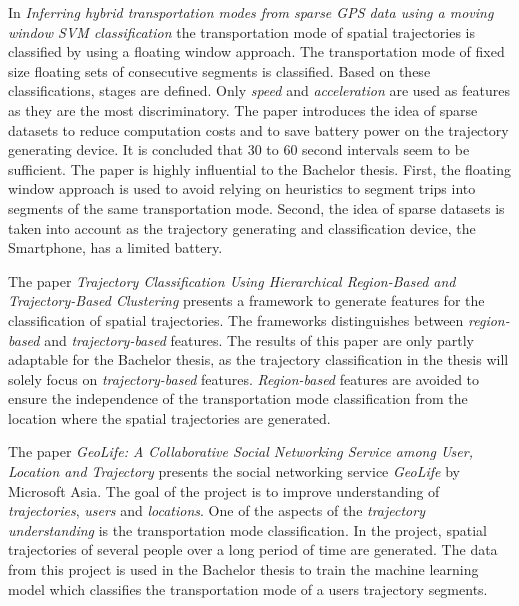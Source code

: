 In \textit{Inferring hybrid transportation modes from sparse GPS data using a moving window SVM classification} \cite{Bolbol2012} the transportation mode of spatial trajectories is classified by using a floating window approach. The transportation mode of fixed size floating sets of consecutive segments is classified. Based on these classifications, stages are defined. Only \textit{speed} and \textit{acceleration} are used as features as they are the most discriminatory. The paper introduces the idea of sparse datasets to reduce computation costs and to save battery power on the trajectory generating device. It is concluded that 30 to 60 second intervals seem to be sufficient.\newline
The paper is highly influential to the Bachelor thesis. First, the floating window approach is used to avoid relying on heuristics to segment trips into segments of the same transportation mode. Second, the idea of sparse datasets is taken into account as the trajectory generating and classification device, the Smartphone, has a limited battery. 

The paper \textit{Trajectory Classification Using Hierarchical Region-Based and Trajectory-Based Clustering} \cite{lee2008traclass} presents a framework to generate features for the classification of spatial trajectories. The frameworks distinguishes between \textit{region-based} and \textit{trajectory-based} features.  \newline
The results of this paper are only partly adaptable for the Bachelor thesis, as the trajectory classification in the thesis will solely focus on \textit{trajectory-based} features. \textit{Region-based} features are avoided to ensure the independence of the transportation mode classification from the location where the spatial trajectories are generated.

The paper \textit{GeoLife: A Collaborative Social Networking Service among User, Location and Trajectory} \cite{zheng2010geolife} presents the social networking service \textit{GeoLife} by Microsoft Asia. The goal of the project is to improve understanding of \textit{trajectories}, \textit{users} and \textit{locations}. One of the aspects of the \textit{trajectory understanding} is the transportation mode classification. In the project, spatial trajectories of several people over a long period of time are generated.
The data from this project is used in the Bachelor thesis to train the machine learning model which classifies the transportation mode of a users trajectory segments.

